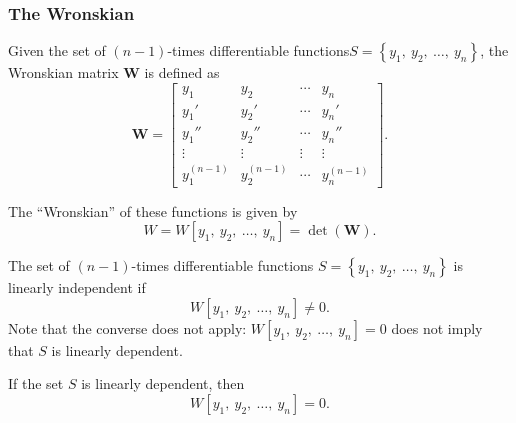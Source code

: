 \documentclass{article}
\begin{document}
\subsubsection{The Wronskian}
\begin{definition}
    Given the set of \(\left( n-1 \right)\)-times differentiable functions\linebreak \(S = \left\{ y_1,\: y_2,\: \dots,\: y_n \right\}\),
    the Wronskian matrix \(\symbf{W}\) is defined as
    \begin{equation*}
        \symbf{W} = \begin{bmatrix}
            y_1                      & y_2                      & \cdots & y_n                      \\
            y_1'                     & y_2'                     & \cdots & y_n'                     \\
            y_1''                    & y_2''                    & \cdots & y_n''                    \\
            \vdots                   & \vdots                   & \vdots & \vdots                   \\
            y_1^{\left( n-1 \right)} & y_2^{\left( n-1 \right)} & \cdots & y_n^{\left( n-1 \right)}
        \end{bmatrix}.
    \end{equation*}
\end{definition}
The ``Wronskian'' of these functions is given by
\begin{equation*}
    W = W\left[ y_1,\: y_2,\: \dots,\: y_n  \right] = \det{\left( \symbf{W} \right)}.
\end{equation*}
\begin{theorem}
    The set of \(\left( n-1 \right)\)-times differentiable functions \(S = \left\{ y_1,\: y_2,\: \dots,\: y_n \right\}\)
    is linearly independent if
    \begin{equation*}
        W\left[ y_1,\: y_2,\: \dots,\: y_n  \right] \neq 0.
    \end{equation*}
    Note that the converse does not apply:
    \(W\left[ y_1,\: y_2,\: \dots,\: y_n  \right] = 0\) does not imply that \(S\) is linearly dependent.
\end{theorem}
\begin{corollary}
    If the set \(S\) is linearly dependent, then
    \begin{equation*}
        W\left[ y_1,\: y_2,\: \dots,\: y_n  \right] = 0.
    \end{equation*}
\end{corollary}
\end{document}
